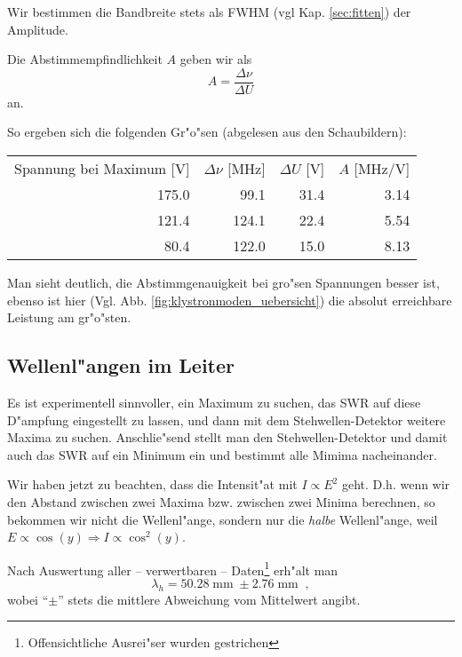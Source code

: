 \documentclass[a4paper,12pt]{article}
\newcommand{\folgt}{\ensuremath{\Rightarrow}}
\begin{document}
Wir bestimmen die Bandbreite stets als FWHM (vgl
Kap. \ref{sec:fitten}) der Amplitude.

Die Abstimmempfindlichkeit $A$ geben wir als
\begin{equation}
  \label{eq:def_abstimmempfindlichkeit}
  A = \frac{ \Delta \nu } { \Delta U }
\end{equation}
an.
 
So ergeben sich die folgenden Gr"o"sen (abgelesen aus den Schaubildern):

\begin{tabular}{ r  r  r  r }
  Spannung bei Maximum [V] & $\Delta \nu$ [MHz] &   $\Delta U$ [V] &  $A$ [MHz/V] \\
     175.0 & 99.1 &  31.4 & 3.14 \\
     121.4  & 124.1 & 22.4 & 5.54 \\
     80.4  &  122.0  & 15.0 & 8.13
\end{tabular}

Man sieht deutlich, die Abstimmgenauigkeit bei gro"sen Spannungen
besser ist, ebenso ist hier
(Vgl. Abb. \ref{fig:klystronmoden_uebersicht}) die absolut erreichbare
Leistung am gr"o"sten.







\subsection{Wellenl"angen im Leiter}
\label{sec:wellenlangen_im_leiter}




Es ist experimentell sinnvoller, ein Maximum zu suchen, das SWR auf
diese D"ampfung eingestellt zu lassen, und dann mit dem Stehwellen-Detektor
weitere Maxima zu suchen. Anschlie"send stellt man den Stehwellen-Detektor
und damit auch das SWR auf ein Minimum ein und bestimmt alle Mimima
nacheinander.

Wir haben jetzt zu beachten, dass die Intensit"at mit $I \propto E^2$
geht. D.h. wenn wir den Abstand zwischen zwei Maxima bzw. zwischen
zwei Minima berechnen, so bekommen wir nicht die Wellenl"ange, sondern
nur die \emph{halbe} Wellenl"ange, weil $E \propto \cos(y) \folgt I
\propto \cos^2(y)$.

Nach Auswertung aller -- verwertbaren --
Daten\footnote{Offensichtliche Ausrei"ser wurden gestrichen} erh"alt
man
\begin{equation}
  \label{eq:1}
  \lambda_h = 50.28 \operatorname{mm} \pm 2.76 \operatorname{mm} \;,
\end{equation}
wobei "`$\pm$"' stets die mittlere Abweichung vom Mittelwert angibt.
\end{document}
